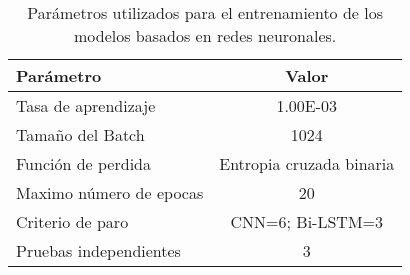 
\begin{table}[t]
\caption{Parámetros utilizados para el entrenamiento de los modelos basados en redes neuronales.} \label{table:param_redes}
\begin{center}

\begin{tabular}{lc}
\hline
\rowcolor[HTML]{C0C0C0} 
\textbf{Parámetro}      & \textbf{Valor}           \\ \hline
Tasa de aprendizaje     & 1.00E-03                 \\ \hline
Tamaño del Batch        & 1024                     \\ \hline
Función de perdida      & Entropia cruzada binaria \\ \hline
Maximo número de epocas & 20                       \\ \hline
Criterio de paro    & CNN=6; Bi-LSTM=3         \\ \hline
Pruebas independientes  & 3                        \\ \hline
\end{tabular}

\end{center}
\end{table}